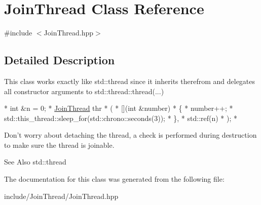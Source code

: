 \hypertarget{class_join_thread}{\section{Join\-Thread Class Reference}
\label{class_join_thread}
}


{\ttfamily \#include $<$Join\-Thread.\-hpp$>$}



\subsection{Detailed Description}
This class works exactly like std\-::thread since it inherits therefrom and delegates all constructor arguments to std\-::thread\-::thread(...)


\begin{DoxyCode}
*  \textcolor{keywordtype}{int} &n = 0;
*  \hyperlink{class_join_thread}{JoinThread} thr
*  (
*      [](\textcolor{keywordtype}{int} &number)
*      \{
*          number++;
*          std::this\_thread::sleep\_for(std::chrono::seconds(3));
*      \},
*      std::ref(n)
*  );
*  
\end{DoxyCode}


Don't worry about detaching the thread, a check is performed during destruction to make sure the thread is joinable.

\begin{DoxySeeAlso}{See Also}
std\-::thread 
\end{DoxySeeAlso}


The documentation for this class was generated from the following file\-:\begin{DoxyCompactItemize}
\item 
include/\-Join\-Thread/Join\-Thread.\-hpp\end{DoxyCompactItemize}
